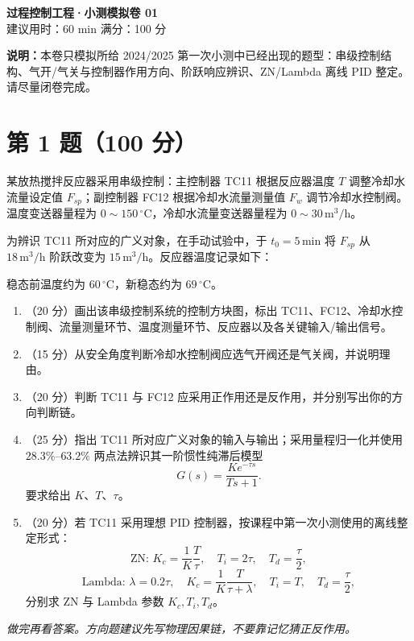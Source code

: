 \documentclass[UTF8,a4paper,11pt]{ctexart}
\begin{document}
\begin{center}
{\LARGE\bfseries 过程控制工程·小测模拟卷 01}\\[4pt]
{\large 建议用时：60 min \qquad 满分：100 分}
\end{center}

\textbf{说明：}本卷只模拟所给 2024/2025 第一次小测中已经出现的题型：串级控制结构、气开/气关与控制器作用方向、阶跃响应辨识、ZN/Lambda 离线 PID 整定。请尽量闭卷完成。

\section*{第 1 题（100 分）}
某放热搅拌反应器采用串级控制：主控制器 TC11 根据反应器温度 $T$ 调整冷却水流量设定值 $F_{sp}$；副控制器 FC12 根据冷却水流量测量值 $F_w$ 调节冷却水控制阀。温度变送器量程为 $0\sim150\,^{\circ}\mathrm C$，冷却水流量变送器量程为 $0\sim30\,\mathrm{m^3/h}$。

为辨识 TC11 所对应的广义对象，在手动试验中，于 $t_0=5\,\mathrm{min}$ 将 $F_{sp}$ 从 $18\,\mathrm{m^3/h}$ 阶跃改变为 $15\,\mathrm{m^3/h}$。反应器温度记录如下：

\begin{center}
\end{center}

稳态前温度约为 $60\,^{\circ}\mathrm C$，新稳态约为 $69\,^{\circ}\mathrm C$。

\begin{enumerate}
\item[(1)] （20 分）画出该串级控制系统的控制方块图，标出 TC11、FC12、冷却水控制阀、流量测量环节、温度测量环节、反应器以及各关键输入/输出信号。
\item[(2)] （15 分）从安全角度判断冷却水控制阀应选气开阀还是气关阀，并说明理由。
\item[(3)] （20 分）判断 TC11 与 FC12 应采用正作用还是反作用，并分别写出你的方向判断链。
\item[(4)] （25 分）指出 TC11 所对应广义对象的输入与输出；采用量程归一化并使用 $28.3\%$--$63.2\%$ 两点法辨识其一阶惯性纯滞后模型
\[
G(s)=\frac{K e^{-\tau s}}{Ts+1}.
\]
要求给出 $K$、$T$、$\tau$。
\item[(5)] （20 分）若 TC11 采用理想 PID 控制器，按课程中第一次小测使用的离线整定形式：
\[
\text{ZN: }K_c=\frac{1}{K}\frac{T}{\tau},\quad T_i=2\tau,\quad T_d=\frac{\tau}{2},
\]
\[
\text{Lambda: }\lambda=0.2\tau,\quad K_c=\frac{1}{K}\frac{T}{\tau+\lambda},\quad T_i=T,\quad T_d=\frac{\tau}{2},
\]
分别求 ZN 与 Lambda 参数 $K_c,T_i,T_d$。
\end{enumerate}
\vfill
\begin{center}
\textit{做完再看答案。方向题建议先写物理因果链，不要靠记忆猜正反作用。}
\end{center}
\end{document}
